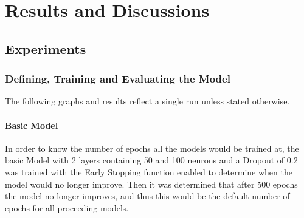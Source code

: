 \documentclass[10pt,11pt,12pt,oneside]{book}
\begin{document}
\chapter{Results and Discussions}
\section{Experiments}

\subsection{Defining, Training and Evaluating the Model}
The following graphs and results reflect a single run unless stated otherwise.
\subsubsection{Basic Model}
In order to know the number of epochs all the models would be trained at, the basic Model with 2 layers containing 50 and 100 neurons and a Dropout of 0.2 was trained with the Early Stopping function enabled to determine when the model would no longer improve. Then it was determined that after 500 epochs the model no longer improves, and thus this would be the default number of epochs for all proceeding models.
\end{document}
